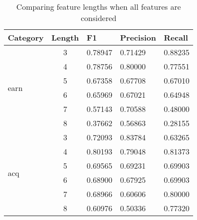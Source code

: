 \documentclass{article}
\theoremstyle{definition}
\begin{document}
\begin{table}[]
    \centering
    \caption{Comparing feature lengths when all features are considered}
    \label{all-features}
    \begin{tabular}{|l|c|l|l|l|}
    \hline
    Category              & \multicolumn{1}{l|}{Length} & F1      & Precision & Recall  \\ \hline
    \multirow{6}{*}{earn} & 3                           & 0.78947 & 0.71429   & 0.88235 \\ \cline{2-5} 
                          & 4                           & 0.78756 & 0.80000   & 0.77551 \\ \cline{2-5} 
                          & 5                           & 0.67358 & 0.67708   & 0.67010 \\ \cline{2-5} 
                          & 6                           & 0.65969 & 0.67021   & 0.64948 \\ \cline{2-5} 
                          & 7                           & 0.57143 & 0.70588   & 0.48000 \\ \cline{2-5} 
                          & 8                           & 0.37662 & 0.56863   & 0.28155 \\ \hline
    \multirow{6}{*}{acq}  & 3                           & 0.72093 & 0.83784   & 0.63265 \\ \cline{2-5} 
                          & 4                           & 0.80193 & 0.79048   & 0.81373 \\ \cline{2-5} 
                          & 5                           & 0.69565 & 0.69231   & 0.69903 \\ \cline{2-5} 
                          & 6                           & 0.68900 & 0.67925   & 0.69903 \\ \cline{2-5} 
                          & 7                           & 0.68966 & 0.60606   & 0.80000 \\ \cline{2-5} 
                          & 8                           & 0.60976 & 0.50336   & 0.77320 \\ \hline
    \end{tabular}
\end{table}
\end{document}

